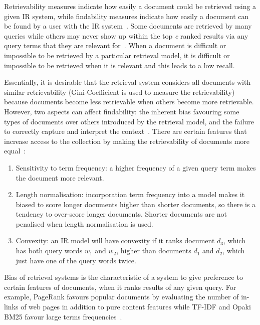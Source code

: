 Retrievability measures indicate how easily a document could be retrieved using a given IR system, while findability measures indicate how easily a document can be found by a user with the IR system~\citep{azzopardi2008retrievability}. Some documents are retrieved by many queries while others may never show up within the top \textit{c} ranked results via any query terms that they are relevant for~\citep{lupu2013patent}. When a document is difficult or impossible to be retrieved by a particular retrieval model, it is difficult or impossible to be retrieved when it is relevant and this leads to a low recall. 

Essentially, it is desirable that the retrieval system considers all documents with similar retrievability (Gini-Coefficient is used to measure the retrievability) because documents become less retrievable when others become more retrievable. However, two aspects can affect findability: the inherent bias favouring some types of documents over others introduced by the retrieval model, and the failure to correctly capture and interpret the context~\citep{bashir2009improving, bashir2011relationship}. There are certain features that increase access to the collection by making the retrievability of documents more equal~\citep{bache2010improving}:
\begin{enumerate}
\item Sensitivity to term frequency: a higher frequency of a given query term makes the document more relevant.
\item Length normalisation: incorporation term frequency into a model makes it biased to score longer documents higher than shorter documents, so there is a tendency to over-score longer documents. Shorter documents are not penalised when length normalisation is used.
\item Convexity: an IR model will have convexity if it ranks document $ d_{3} $, which has both query words $ w_{1} $ and $ w_{2} $, higher than documents $ d_{1} $ and $ d_{2} $, which just have one of the query words twice. 
\end{enumerate}
Bias of retrieval systems is the characteristic of a system to give preference to certain features of documents, when it ranks results of any given query. For example, PageRank favours popular documents by evaluating the number of in-links of web pages in addition to pure content features while TF-IDF and Opaki BM25 favour large terms frequencies~\citep{bashir2011relationship}.\\\\
